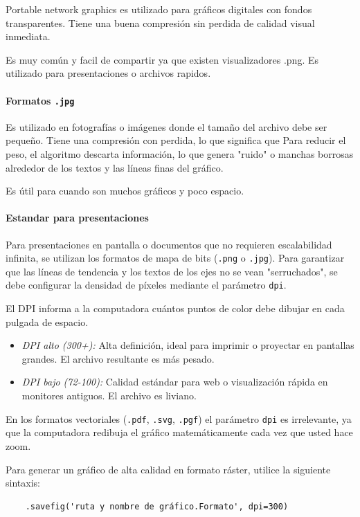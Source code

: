 Portable network graphics es utilizado para gráficos digitales con fondos transparentes. Tiene una buena compresión sin perdida de calidad visual inmediata.

Es muy común y facil de compartir ya que existen visualizadores .png. Es utilizado para presentaciones o archivos rapidos.

\paragraph{Formatos \texttt{.jpg}}

Es utilizado en fotografías o imágenes donde el tamaño del archivo debe ser pequeño. Tiene una compresión con perdida, lo que significa que  Para reducir el peso, el algoritmo descarta información, lo que genera "ruido" o manchas borrosas alrededor de los textos y las líneas finas del gráfico.

Es útil para cuando son muchos gráficos y poco espacio.

\paragraph{Estandar para presentaciones}

Para presentaciones en pantalla o documentos que no requieren escalabilidad infinita, se utilizan los formatos de mapa de bits (\texttt{.png} o \texttt{.jpg}). Para garantizar que las líneas de tendencia y los textos de los ejes no se vean "serruchados", se debe configurar la densidad de píxeles mediante el parámetro \texttt{dpi}.

El DPI informa a la computadora cuántos puntos de color debe dibujar en cada pulgada de espacio.
\begin{itemize}
\item \textit{DPI alto (300+):} Alta definición, ideal para imprimir o proyectar en pantallas grandes. El archivo resultante es más pesado.
\item \textit{DPI bajo (72-100):} Calidad estándar para web o visualización rápida en monitores antiguos. El archivo es liviano.
\end{itemize}

En los formatos vectoriales (\texttt{.pdf}, \texttt{.svg}, \texttt{.pgf}) el parámetro \texttt{dpi} es irrelevante, ya que la computadora redibuja el gráfico matemáticamente cada vez que usted hace zoom.

Para generar un gráfico de alta calidad en formato ráster, utilice la siguiente sintaxis:
\begin{verbatim}
    .savefig('ruta y nombre de gráfico.Formato', dpi=300)
\end{verbatim}

